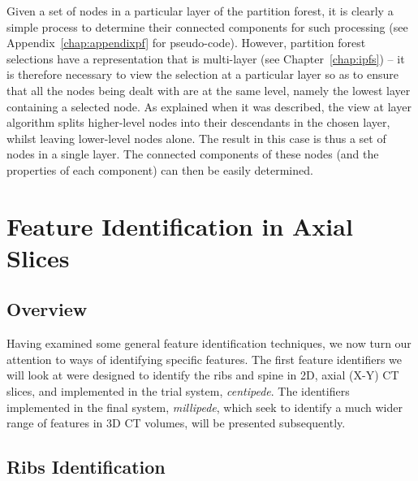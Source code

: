 Given a set of nodes in a particular layer of the partition forest, it is clearly a simple process to determine their connected components for such processing (see Appendix~\ref{chap:appendixpf} for pseudo-code). However, partition forest selections have a representation that is multi-layer (see Chapter~\ref{chap:ipfs}) -- it is therefore necessary to view the selection at a particular layer so as to ensure that all the nodes being dealt with are at the same level, namely the lowest layer containing a selected node. As explained when it was described, the view at layer algorithm splits higher-level nodes into their descendants in the chosen layer, whilst leaving lower-level nodes alone. The result in this case is thus a set of nodes in a single layer. The connected components of these nodes (and the properties of each component) can then be easily determined.

\afterpage{\clearpage}
\newpage

\section{Feature Identification in Axial Slices}

\subsection{Overview}

Having examined some general feature identification techniques, we now turn our attention to ways of identifying specific features. The first feature identifiers we will look at were designed to identify the ribs and spine in 2D, axial (X-Y) CT slices, and implemented in the trial system, \emph{centipede}. The identifiers implemented in the final system, \emph{millipede}, which seek to identify a much wider range of features in 3D CT volumes, will be presented subsequently.

\subsection{Ribs Identification}

